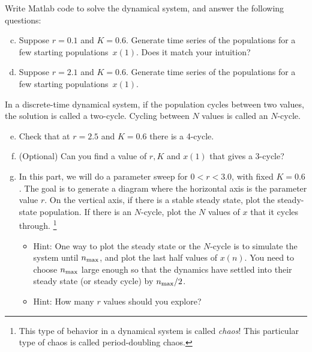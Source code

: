 \documentclass{exam}
\begin{document}
Write Matlab code to solve the dynamical system, and answer the following questions:
\begin{enumerate}[a.]
\setcounter{enumi}{2}
\item Suppose $r=0.1$ and $K=0.6$. Generate time series of the populations for a few starting populations~$x(1)$. Does it match your intuition?
\item Suppose $r=2.1$ and $K=0.6$. Generate time series of the populations for a few starting populations~$x(1)$. 
\end{enumerate}
In a discrete-time dynamical system, if the population cycles between two values, the solution is called a two-cycle. Cycling between $N$ values is called an $N$-cycle. 
\begin{enumerate}[a.]
\setcounter{enumi}{4}
\item Check that at $r=2.5$ and $K=0.6$ there is a 4-cycle. 
\item (Optional) Can you find a value of $r,K$ and $x(1)$ that gives a 3-cycle?
\item In this part, we will do a parameter sweep for $0<r<3.0$, with fixed $K=0.6$. The goal is to generate a diagram where the horizontal axis is the parameter value $r$. On the vertical axis, if there is a stable steady state, plot the steady-state population. If there is an $N$-cycle, plot the $N$ values of $x$ that it cycles through. \footnote{This type of behavior in a dynamical system is called \emph{chaos}! This particular type of chaos is called period-doubling chaos.}
\begin{itemize}
\item Hint: One way to plot the steady state or the $N$-cycle is to simulate the system until $n_{\rm max}$, and plot the last half values of $x(n)$. You need to choose $n_{\rm max}$ large enough so that the dynamics have settled into their steady state (or steady cycle) by $n_{\rm max}/2$.
\item Hint: How many $r$ values should you explore? 
\end{itemize}
\end{enumerate}

  
\end{document}
